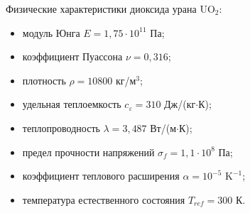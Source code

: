 \documentclass[12pt, a4paper]{article}
\begin{document}
Физические характеристики диоксида урана UO$_2$: 
\begin{itemize}
	\item модуль Юнга $E = 1,75\cdot 10^{11}$ Па;
	\item коэффициент Пуассона $\nu = 0,316$;
	\item плотность $\rho=10800$ кг/м$^3$;
	\item удельная теплоемкость $c_\varepsilon=310$ Дж/(кг$\cdot$К);
	\item теплопроводность $\lambda=3,487$ Вт/(м$\cdot$К);
	\item предел прочности напряжений $\sigma_f = 1,1\cdot10^8$ Па;
	\item коэффициент теплового расширения $\alpha = 10^{-5}\text{ K}^{-1}$;
	\item температура естественного состояния $T_{ref} = 300$ К.
	\end{itemize}
\end{document}
